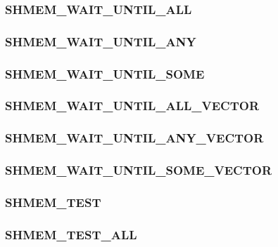 \documentclass[10pt,oneside]{book}
\begin{document}
\subsubsection{\textbf{SHMEM\_WAIT\_UNTIL\_ALL}}\label{subsec:shmem_wait_until_all}


\subsubsection{\textbf{SHMEM\_WAIT\_UNTIL\_ANY}}\label{subsec:shmem_wait_until_any}


\subsubsection{\textbf{SHMEM\_WAIT\_UNTIL\_SOME}}\label{subsec:shmem_wait_until_some}


\subsubsection{\textbf{SHMEM\_WAIT\_UNTIL\_ALL\_VECTOR}}\label{subsec:shmem_wait_until_all_vector}


\subsubsection{\textbf{SHMEM\_WAIT\_UNTIL\_ANY\_VECTOR}}\label{subsec:shmem_wait_until_any_vector}


\subsubsection{\textbf{SHMEM\_WAIT\_UNTIL\_SOME\_VECTOR}}\label{subsec:shmem_wait_until_some_vector}


\subsubsection{\textbf{SHMEM\_TEST}}\label{subsec:shmem_test}


\subsubsection{\textbf{SHMEM\_TEST\_ALL}}\label{subsec:shmem_test_all}

\end{document}
